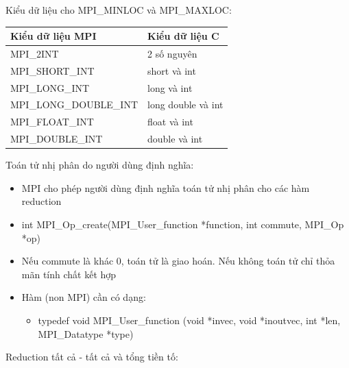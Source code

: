 \documentclass[14pt, a4paper]{article}
\numberwithin{equation}{section}
\numberwithin{figure}{section}
\numberwithin{dl}{section}
\numberwithin{md}{section}
\numberwithin{bd}{section}
\numberwithin{dn}{section}
\numberwithin{hq}{section}
\begin{document}
Kiểu dữ liệu cho MPI\_MINLOC và MPI\_MAXLOC:

\begin{table}[H]
    \centering
    \begin{tabular}{ll}
        \hline
        Kiểu dữ liệu MPI & Kiểu dữ liệu C \\
        \hline
        MPI\_2INT & 2 số nguyên \\
        MPI\_SHORT\_INT & short và int \\
        MPI\_LONG\_INT & long và int \\
        MPI\_LONG\_DOUBLE\_INT & long double và int \\
        MPI\_FLOAT\_INT & float và int \\
        MPI\_DOUBLE\_INT & double và int \\
    \end{tabular}
\end{table}

Toán tử nhị phân do người dùng định nghĩa:

\begin{itemize}
    \item MPI cho phép người dùng định nghĩa toán tử nhị phân cho các hàm reduction
    \item int MPI\_Op\_create(MPI\_User\_function *function, int commute,
                        MPI\_Op *op)
    \item Nếu commute là khác 0, toán tử là giao hoán. Nếu không toán tử chỉ thỏa mãn tính chất kết hợp
    \item Hàm (non MPI) cần có dạng:
    \begin{itemize}
        \item typedef void MPI\_User\_function (void *invec, void *inoutvec,
                                                int *len, MPI\_Datatype *type) 
    \end{itemize}
\end{itemize}

Reduction tất cả - tất cả và tổng tiền tố:
\end{document}
